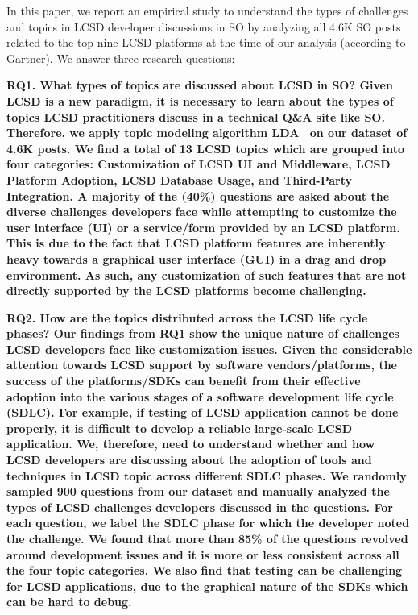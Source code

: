 In this paper, we report an empirical study to understand the types of challenges and topics in  LCSD developer discussions in SO by analyzing all 4.6K SO posts related to the top nine  LCSD platforms at the time of our analysis (according to Gartner). We answer 
three research questions:

\nd\bf{RQ1. What types of topics are discussed about  LCSD in SO?} Given  LCSD is a new paradigm, 
it is necessary to learn about the types of topics  LCSD practitioners discuss in a technical Q\&A site like SO. Therefore, we apply topic modeling algorithm LDA~\cite{Blei-LDA-JournalMachineLearning2003} on our dataset of 4.6K posts. We find a total of 13  LCSD topics which are grouped into four categories: Customization of  LCSD UI and Middleware,  
 LCSD Platform Adoption,  LCSD Database Usage, and Third-Party Integration. A majority of the (40\%) questions are asked about the diverse challenges developers face while attempting to customize the user interface (UI) or a service/form provided by an  LCSD platform. This is due to the fact that 
 LCSD platform features are inherently heavy towards a graphical user interface (GUI) in a drag and drop environment. As such, any customization 
of such features that are not directly supported by the  LCSD platforms become challenging.     
    
\nd\bf{RQ2. How are the topics distributed across the  LCSD life cycle phases?} Our findings from RQ1 show the unique nature of challenges  LCSD developers face like customization issues. 
Given the considerable attention towards  LCSD support by software vendors/platforms, the success of the platforms/SDKs can benefit from their effective adoption into the various stages of a software development life cycle (SDLC). For example, if testing of  LCSD 
application cannot be done properly, it is difficult to develop a reliable large-scale  LCSD application. We, therefore, 
need to understand whether and how  LCSD developers are discussing about the adoption of tools and techniques in  LCSD topic across different SDLC phases. We randomly sampled 900 questions from our dataset and manually analyzed the types of  LCSD challenges developers discussed in the questions. For each question, we label the SDLC phase for which the developer noted the challenge. We found that more than 85\% of the questions revolved around development issues and it is more or less consistent across all the four topic categories. We also find that testing can be challenging for  LCSD applications, due to the graphical nature of the SDKs which can be hard to debug.   

